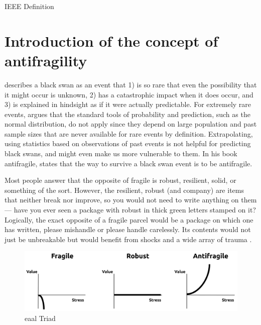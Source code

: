 IEEE Definition


\section{Introduction of the concept of antifragility}
\label{sec:introantifragility}
\textcite{Taleb2008} describes a black swan as an event that 1) is so rare that even the possibility that it might occur is unknown, 2) has a catastrophic impact when it does occur, and 3) is explained in hindsight as if it were actually predictable. For extremely rare events, \citeauthor{Taleb2008} argues that the standard tools of probability and prediction, such as the normal distribution, do not apply since they depend on large population and past sample sizes that are never available for rare events by definition. Extrapolating, using statistics based on observations of past events is not helpful for predicting black swans, and might even make us more vulnerable to them. In his book \Gls{antifragile}, \textcite{Taleb2012} states that the way to survive a black swan event is to be \gls{antifragile}.\par
Most people answer that the opposite of \gls{fragile} is \gls{robust}, \gls{resilient}, solid, or something of the sort. However, the \gls{resilient}, \gls{robust} (and company) are items that neither break nor improve, so you would not need to write anything on them — have you ever seen a package with \gls{robust} in thick green letters stamped on it? Logically, the exact opposite of a \gls{fragile} parcel would be a package on which one has written, please mishandle or please handle carelessly. Its contents would not just be unbreakable but would benefit from shocks and a wide array of trauma \parencite{Taleb2012}.

\begin{figure}[h!]
	\centering
	\includegraphics[width=0.7\linewidth]{images/eaal-triad}
	\caption[EAAL Triad]{\acrshort{eaal} Triad \parencite{Botjes2020}}
	\label{fig:eaal-triad}
\end{figure}

